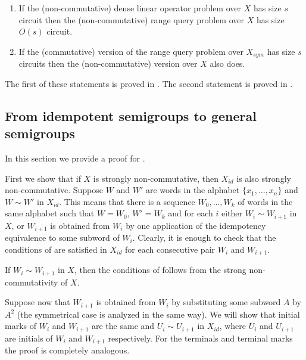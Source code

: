 \documentclass{toc}
\begin{document}
\begin{enumerate}
	\item If the (non-commutative) dense linear operator problem over $X$ has size $s$
	circuit then the (non-commutative) 
	range query
	problem over $X$ has size
	$O(s)$ circuit.
	\item If the (commutative) version of the 
	range query
	problem over $X_{sym}$ has
	size $s$ circuits then the (non-commutative) version over $X$ also does.
\end{enumerate}

The first of these statements is proved in  .
The second statement is proved in .

\subsection{From idempotent semigroups to general semigroups}\label{sec:noncommutative_extension}

In this section we provide a proof for .


First we show that if $X$ is strongly non-commutative, then $X_{id}$ is also strongly non-commutative.
Suppose $W$ and $W'$ are words in the alphabet $\{x_1,\ldots, x_n\}$ and $W \sim W'$ in $X_{id}$. This means that there is a sequence $W_0,\ldots, W_k$ of words in the same alphabet such that $W=W_0$, $W'=W_k$ and for each $i$ either $W_i \sim W_{i+1}$ in $X$, or $W_{i+1}$ is obtained from $W_i$ by one application of the idempotency equivalence to some subword of $W_i$. Clearly, it is enough to check that the conditions of  are satisfied in $X_{id}$ for each consecutive pair $W_i$ and $W_{i+1}$.

If $W_i \sim W_{i+1}$ in $X$, then the conditions of  follows from the strong non-commutativity of $X$.

Suppose now that $W_{i+1}$ is obtained from $W_{i}$ by substituting some subword $A$ by $A^2$ (the symmetrical case is analyzed in the same way). We will show that initial marks of $W_i$ and $W_{i+1}$ are the same and $U_{i} \sim U_{i+1}$ in $X_{id}$, where $U_{i}$ and $U_{i+1}$ are initials of $W_i$ and $W_{i+1}$ respectively. For the terminals and terminal marks the proof is completely analogous.
\end{document}
